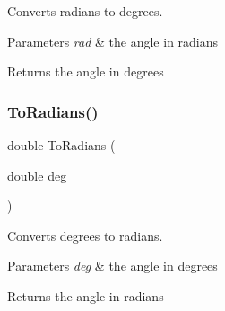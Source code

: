 Converts radians to degrees.


\begin{DoxyParams}{Parameters}
{\em rad} & the angle in radians \\
\hline
\end{DoxyParams}
\begin{DoxyReturn}{Returns}
the angle in degrees 
\end{DoxyReturn}
\mbox{\label{group__math__group_gafdd4eddaf6eadf34406a865e0cf6a30a}} 
\subsubsection{\texorpdfstring{To\+Radians()}{ToRadians()}}
{\footnotesize\ttfamily double To\+Radians (\begin{DoxyParamCaption}\item[{double}]{deg }\end{DoxyParamCaption})}

Converts degrees to radians.


\begin{DoxyParams}{Parameters}
{\em deg} & the angle in degrees \\
\hline
\end{DoxyParams}
\begin{DoxyReturn}{Returns}
the angle in radians 
\end{DoxyReturn}
